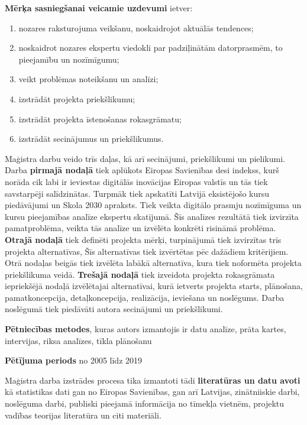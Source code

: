\par
\textbf{Mērķa sasniegšanai veicamie uzdevumi} ietver:
\begin{enumerate}
    \item nozares raksturojuma veikšanu, noskaidrojot aktuālās tendences;
    \item noskaidrot nozares ekspertu viedokli par padziļinātām datorprasmēm, to pieejamību un nozīmīgumu;
    \item veikt problēmas noteikšanu un analīzi;
    \item izstrādāt projekta priekšlikumu;
    \item izstrādāt projekta īstenošanas rokasgrāmatu;
    \item izstrādāt secinājumus un priekšlikumus.
\end{enumerate}
\par
Maģistra darbu veido trīs daļas, kā arī secinājumi, priekšlikumi un pielikumi.
Darba \textbf{pirmajā nodaļā} tiek aplūkots Eiropas Savienības \acrshort{desi} indekss, kurš norāda
cik labi ir ieviestas digitālās inovācijas Eiropas valstīs un tās tiek savstarpēji salīdzinātas. Turpmāk
tiek apskatīti Latvijā eksistējošo kursu piedāvājumi un Skola 2030 apraksts. Tiek veikta digitālo prasmju
nozīmīguma un kursu pieejamības analīze ekspertu skatījumā. Šīs analīzes rezultātā tiek izvirzīta 
pamatproblēma, veikta tās analīze un izvēlēta konkrēti risināmā problēma. 
\textbf{Otrajā nodaļā} tiek definēti projekta mērķi, turpinājumā tiek izvirzītas trīs projekta alternatīvas,
Šīs alternatīvas tiek izvērtētas pēc dažādiem kritērijiem. Otrā nodaļas beigās tiek izvēlēta labākā alternatīva, 
kura tiek noformēta projekta priekšlikuma veidā. 
\textbf{Trešajā nodaļā} tiek izveidota projekta rokasgrāmata iepriekšējā nodaļā izvēlētajai alternatīvai,
kurā ietverts projekta starts, plānošana, pamatkoncepcija, detaļkoncepcija, realizācija, ieviešana un noslēgums. 
Darba noslēgumā tiek piedāvāti autora secinājumi un priekšlikumi.
\par
\textbf{Pētniecības metodes}, kuras autors izmantojis ir datu analīze,
prāta kartes, intervijas, riksa analīzes, tīkla plānošanu
\par
\textbf{Pētījuma periods} no 2005 līdz 2019
\par
Maģistra darba izstrādes procesa tika izmantoti tādi \textbf{literatūras un datu avoti} kā statistikas dati
gan no Eiropas Savienības, gan arī Latvijas, zinātniiskie darbi, noslēguma darbi, publiski pieejamā informācija
no tīmekļa vietnēm, projektu vadības teorijas literatūra un citi materiāli.
